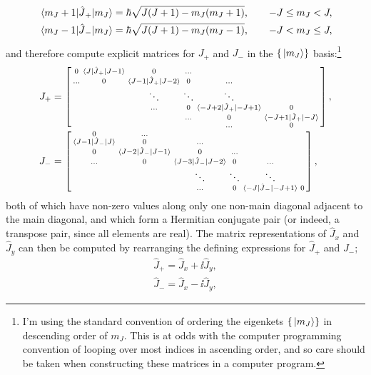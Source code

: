 \begin{align}
\matrixel{m_J + 1}{\hat J_+}{m_J} &= \hbar\sqrt{J(J + 1) - m_J(m_J + 1)}, \qquad -J \leq m_J < J,\\
\matrixel{m_J - 1}{\hat J_-}{m_J} &= \hbar\sqrt{J(J + 1) - m_J(m_J - 1)}, \qquad -J < m_J \leq J,
\end{align}
and therefore compute explicit matrices for $J_+$ and $J_-$ in the $\{\ket{m_J}\}$ basis:\footnote{I'm using the standard convention of ordering the eigenkets $\{\ket{m_J}\}$ in descending order of $m_J$. This is at odds with the computer programming convention of looping over most indices in ascending order, and so care should be taken when constructing these matrices in a computer program.}
\begin{align}
J_+ &=
\left[\begin{smallmatrix}
0 &  \matrixel{J}{\hat J_+}{J - 1} & 0 & \hdots\\
\hdots & 0 & \matrixel{J - 1}{\hat J_+}{J - 2} & 0 & \hdots\\
& & \ddots & \ddots & \ddots\\
 & & \hdots & 0 & \matrixel{ -J + 2}{\hat J_+}{-J + 1} & 0\\
 & & & \hdots & 0 & \matrixel{ -J + 1}{\hat J_+}{-J}\\
 & & & & \hdots & 0\\
\end{smallmatrix} \right],\\
J_- &=
\left[\begin{smallmatrix}
    0 & \hdots \\
    \matrixel{J - 1}{\hat J_-}{J} & 0 & \hdots\\
    0 & \matrixel{J - 2}{\hat J_-}{J - 1} & 0 & \hdots\\
    \hdots & 0 & \matrixel{J - 3}{\hat J_-}{J - 2} & 0 & \hdots\\
    & & \ddots & \ddots & \ddots\\
    & & \hdots & 0 & \matrixel{-J}{\hat J_-}{-J + 1} & 0 \\
\end{smallmatrix} \right],
\end{align}
both of which have non-zero values along only one non-main diagonal adjacent to the main diagonal, and which form a Hermitian conjugate pair (or indeed, a transpose pair, since all elements are real). The matrix representations of $\hat J_x$ and $\hat J_y$ can then be computed by rearranging the defining expressions for $\hat J_+$ and $J_-$;
\begin{align}
\hat J_+ = \hat J_x + \ii \hat J_y,\\
\hat J_- = \hat J_x - \ii \hat J_y,
\end{align}
